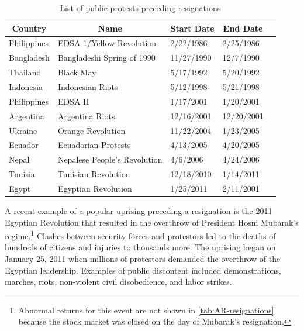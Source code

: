 \documentclass[12pt,final,fleqn]{article}
\theoremstyle{plain}
\begin{document}
\begin{table}[H]
\caption{List of public protests preceding resignations} \label{tab:protest-list}
\vspace{-5pt}
\footnotesize
\begin{center}
\begin{threeparttable}
\begin{tabular*}{\textwidth}{l@{\extracolsep{\fill}}llll}
  \hline
    \hline
\multicolumn{1}{c}{Country}&\multicolumn{1}{c}{Name}&\multicolumn{1}{c}{Start Date}&\multicolumn{1}{c}{End Date}\\
  \hline
Philippines & EDSA 1/Yellow Revolution & 2/22/1986 & 2/25/1986\\
Bangladesh & Bangladeshi Spring of 1990 & 11/27/1990 & 12/7/1990\\
Thailand & Black May & 5/17/1992 & 5/20/1992\\
Indonesia & Indonesian Riots & 5/12/1998 & 5/21/1998\\
Philippines & EDSA II & 1/17/2001 & 1/20/2001\\
Argentina & Argentina Riots & 12/16/2001 & 12/20/2001\\
Ukraine & Orange Revolution & 11/22/2004 & 1/23/2005\\
Ecuador & Ecuadorian Protests & 4/13/2005 & 4/20/2005\\
Nepal & Nepalese People's Revolution & 4/6/2006 & 4/24/2006\\
Tunisia & Tunisian Revolution & 12/18/2010 & 1/14/2011\\
Egypt & Egyptian Revolution & 1/25/2011 & 2/11/2001\\
   \hline
   \hline
\end{tabular*}
\scriptsize
\end{threeparttable}
\end{center}
\end{table}

A recent example of a popular uprising preceding a resignation is the 2011 Egyptian Revolution that resulted in the overthrow of President Hosni Mubarak's regime.\footnote{Abnormal returns for this event are not shown in \autoref{tab:AR-resignations} because the stock market was closed on the day of Mubarak's resignation.} Clashes between security forces and protestors led to the deaths of hundreds of citizens and injuries to thousands more. The uprising began on January 25, 2011 when millions of protestors demanded the overthrow of the Egyptian leadership. Examples of public discontent included demonstrations, marches, riots, non-violent civil disobedience, and labor strikes.
\end{document}
